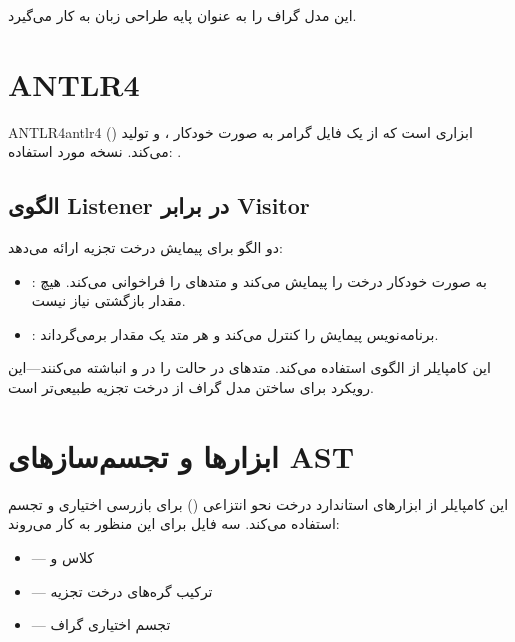 \documentclass{nngraph-fa}
\begin{document}
 این مدل گراف را به عنوان پایه طراحی زبان به کار می‌گیرد.

\section{ANTLR4}

\begin{dfnbox}{ANTLR4}{antlr4}
 () ابزاری
است که از یک فایل گرامر  به صورت خودکار ،
 و  تولید می‌کند.
نسخه مورد استفاده: .
\end{dfnbox}

\subsection{الگوی Listener در برابر Visitor}

 دو الگو برای پیمایش درخت تجزیه ارائه می‌دهد:

\begin{itemize}
    \item \textbf{}:  به صورت خودکار
    درخت را پیمایش می‌کند و متدهای  را فراخوانی می‌کند.
    هیچ مقدار بازگشتی نیاز نیست.
    \item \textbf{}: برنامه‌نویس پیمایش را کنترل می‌کند و هر
    متد یک مقدار برمی‌گرداند.
\end{itemize}

\begin{notebox}
این کامپایلر از الگوی  استفاده می‌کند. متدهای 
در  حالت را در  و
 انباشته می‌کنند---این رویکرد برای ساختن مدل گراف
از درخت تجزیه طبیعی‌تر است.
\end{notebox}

\section{ابزارها و تجسم‌سازهای AST}

این کامپایلر از ابزارهای استاندارد درخت نحو انتزاعی () برای بازرسی اختیاری و تجسم استفاده می‌کند. سه فایل برای این منظور به کار می‌روند:

\begin{itemize}
    \item {} --- کلاس  و 
    \item {} --- ترکیب گره‌های درخت تجزیه
    \item {} --- تجسم اختیاری گراف
\end{itemize}
\end{document}
